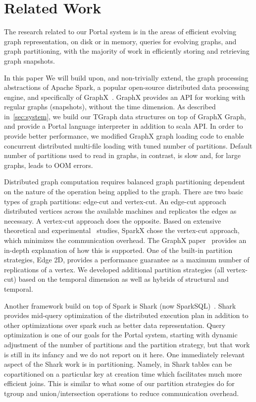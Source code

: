 \section{Related Work}
\label{sec:related}

The research related to our Portal system is in the areas of efficient
evolving graph representation, on disk or in memory, queries for
evolving graphs, and graph partitioning, with the majority of work in
efficiently storing and retrieving graph snapshots.

In this paper We will build upon, and non-trivially extend, the graph
processing abstractions of Apache Spark, a popular open-source
distributed data processing engine, and specifically of
GraphX~\cite{DBLP:conf/osdi/GonzalezXDCFS14}.  GraphX provides an API
for working with regular graphs (snapshots), without the time
dimension.  As described in~\ref{sec:system}, we build our TGraph data
structures on top of GraphX Graph, and provide a Portal language
interpreter in addition to scala API.  In order to provide better
performance, we modified GraphX graph loading code to enable
concurrent distributed multi-file loading with tuned number of
partitions.  Default number of partitions used to read in graphs, in
contrast, is slow and, for large graphs, leads to OOM errors. 

Distributed graph computation requires balanced graph partitioning
dependent on the nature of the operation being applied to the graph.
There are two basic types of graph partitions: edge-cut and
vertex-cut.  An edge-cut approach distributed vertices across the
available machines and replicates the edges as necessary.  A
vertex-cut approach does the opposite.  Based on extensive theoretical
and experimental~\cite{Gonzalez2012} studies, SparkX chose the
vertex-cut approach, which minimizes the communication overhead.  The
GraphX paper~\cite{DBLP:conf/osdi/GonzalezXDCFS14} provides an
in-depth explanation of how this is supported.  One of the built-in
partition strategies, Edge 2D, provides a performance guarantee as a
maximum number of replications of a vertex.  We developed additional
partition strategies (all vertex-cut) based on the temporal dimension
as well as hybrids of structural and temporal.

Another framework build on top of Spark is Shark (now
SparkSQL)~\cite{Xin2013}.  Shark provides mid-query optimization of
the distributed execution plan in addition to other optimizations over
spark such as better data representation.  Query optimization is one
of our goals for the Portal system, starting with dynamic adjustment
of the number of partitions and the partition strategy, but that work
is still in its infancy and we do not report on it here.  One
immediately relevant aspect of the Shark work is in partitioning.
Namely, in Shark tables can be copartitioned on a particular key at
creation time which facilitates much more efficient joins.  This is
similar to what some of our partition strategies do for tgroup and
union/intersection operations to reduce communication overhead.

